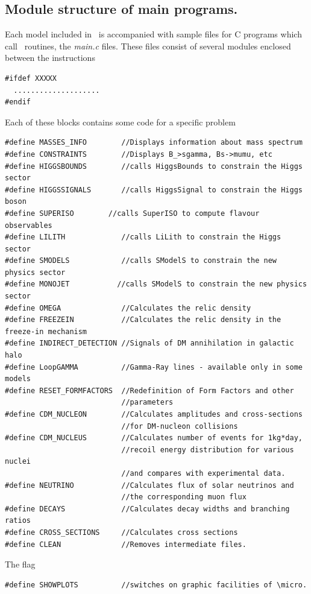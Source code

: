 \documentclass[12pt,a4paper]{article}
\begin{document}
\subsection{Module structure of main programs.}
Each model included in \micro\  is accompanied with sample files for
C  programs which call \micro\ routines, the {\it main.c}  files.  
These files   consist of
several modules enclosed between the instructions
\begin{verbatim}
#ifdef XXXXX
  ....................
#endif
\end{verbatim}
Each of these blocks  contains some code for a specific problem
{\small
\begin{verbatim}
#define MASSES_INFO        //Displays information about mass spectrum 
#define CONSTRAINTS        //Displays B_>sgamma, Bs->mumu, etc
#define HIGGSBOUNDS        //calls HiggsBounds to constrain the Higgs sector
#define HIGGSSIGNALS       //calls HiggsSignal to constrain the Higgs boson
#define SUPERISO        //calls SuperISO to compute flavour observables
#define LILITH             //calls LiLith to constrain the Higgs sector
#define SMODELS            //calls SModelS to constrain the new physics sector
#define MONOJET           //calls SModelS to constrain the new physics sector
#define OMEGA              //Calculates the relic density 
#define FREEZEIN           //Calculates the relic density in the freeze-in mechanism
#define INDIRECT_DETECTION //Signals of DM annihilation in galactic halo
#define LoopGAMMA          //Gamma-Ray lines - available only in some models
#define RESET_FORMFACTORS  //Redefinition of Form Factors and other
                           //parameters 
#define CDM_NUCLEON        //Calculates amplitudes and cross-sections
                           //for DM-nucleon collisions 
#define CDM_NUCLEUS        //Calculates number of events for 1kg*day,
                           //recoil energy distribution for various nuclei
                           //and compares with experimental data.
#define NEUTRINO           //Calculates flux of solar neutrinos and
                           //the corresponding muon flux 
#define DECAYS             //Calculates decay widths and branching ratios  
#define CROSS_SECTIONS     //Calculates cross sections 
#define CLEAN              //Removes intermediate files.
\end{verbatim}
}

The  flag \\

\begin{verbatim}
#define SHOWPLOTS          //switches on graphic facilities of \micro.
\end{verbatim}
\end{document}
